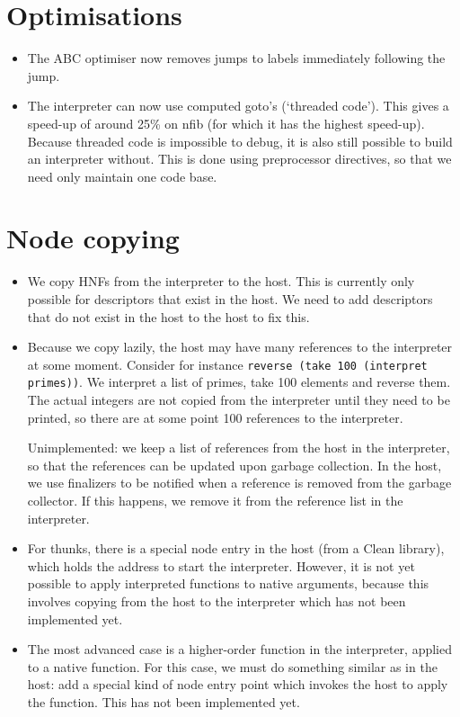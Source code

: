 \documentclass[a4paper]{article}
\begin{document}
\section*{Optimisations}
\begin{itemize}
	\item
		The ABC optimiser now removes jumps to labels immediately following the jump.

	\item
		The interpreter can now use computed goto's (`threaded code').
		This gives a speed-up of around 25\% on nfib (for which it has the highest speed-up).
		Because threaded code is impossible to debug, it is also still possible to build an interpreter without.
		This is done using preprocessor directives, so that we need only maintain one code base.
\end{itemize}

\section*{Node copying}
\begin{itemize}
	\item
		We copy HNFs from the interpreter to the host.
		This is currently only possible for descriptors that exist in the host.
		We need to add descriptors that do not exist in the host to the host to fix this.

	\item
		Because we copy lazily, the host may have many references to the interpreter at some moment.
		Consider for instance \texttt{reverse (take 100 (interpret primes))}.
		We interpret a list of primes, take 100 elements and reverse them.
		The actual integers are not copied from the interpreter until they need to be printed,
			so there are at some point 100 references to the interpreter.

		Unimplemented:
		we keep a list of references from the host in the interpreter,
			so that the references can be updated upon garbage collection.
		In the host, we use finalizers to be notified when a reference is removed from the garbage collector.
		If this happens, we remove it from the reference list in the interpreter.

	\item
		For thunks, there is a special node entry in the host (from a Clean library), which holds the address to start the interpreter.
		However, it is not yet possible to apply interpreted functions to native arguments, because this involves copying from the host to the interpreter which has not been implemented yet.

	\item
		The most advanced case is a higher-order function in the interpreter, applied to a native function.
		For this case, we must do something similar as in the host:
			add a special kind of node entry point which invokes the host to apply the function.
		This has not been implemented yet.
\end{itemize}
\end{document}

